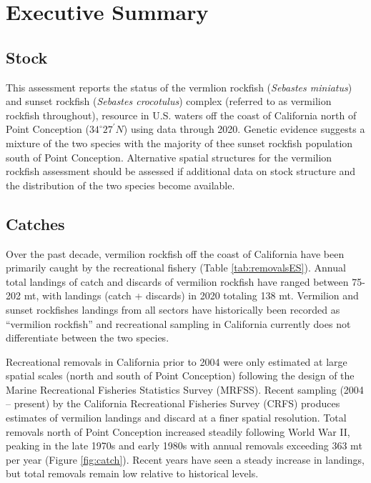 \documentclass[11pt,
  english,
  a4paper,
]{article}
\begin{document}
\hypertarget{executive-summary}{%
\section*{Executive Summary}\label{executive-summary}}

\leavevmode\tagmcend\tagstructend


\hypertarget{stock}{%
\subsection{Stock}\label{stock}}

\leavevmode\tagmcend\tagstructend

This assessment reports the status of the vermlion rockfish (\emph{Sebastes miniatus}) and sunset rockfish (\emph{Sebastes crocotulus}) complex (referred to as vermilion rockfish throughout), resource in U.S. waters off the coast of California north of Point Conception ($34^\circ 27^\prime N$) using data through 2020. Genetic evidence suggests a mixture of the two species with the majority of thee sunset rockfish population south of Point Conception. Alternative spatial structures for the vermilion rockfish assessment should be assessed if additional data on stock structure and the distribution of the two species become available.


\hypertarget{catches}{%
\subsection*{Catches}\label{catches}}

\leavevmode\tagmcend\tagstructend

Over the past decade, vermilion rockfish off the coast of California have been primarily caught by the recreational fishery (Table \ref{tab:removalsES}). Annual total landings of catch and discards of vermilion rockfish have ranged between 75-202 mt, with landings (catch + discards) in 2020 totaling 138 mt. Vermilion and sunset rockfishes landings from all sectors have historically been recorded as ``vermilion rockfish'' and recreational sampling in California currently does not differentiate between the two species.

Recreational removals in California prior to 2004 were only estimated at large spatial scales (north and south of Point Conception) following the design of the Marine Recreational Fisheries Statistics Survey (MRFSS). Recent sampling (2004 -- present) by the California Recreational Fisheries Survey (CRFS) produces estimates of vermilion landings and discard at a finer spatial resolution. Total removals north of Point Conception increased steadily following World War II, peaking in the late 1970s and early 1980s with annual removals exceeding 363 mt per year (Figure \ref{fig:catch}). Recent years have seen a steady increase in landings, but total removals remain low relative to historical levels.
\end{document}
